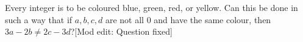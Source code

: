 Every integer is to be coloured blue, green, red, or yellow. Can this be done in such a way that if $a, b, c, d$ are not all $0$ and have the same colour, then $3a-2b \neq 2c-3d$?[Mod edit: Question fixed]
